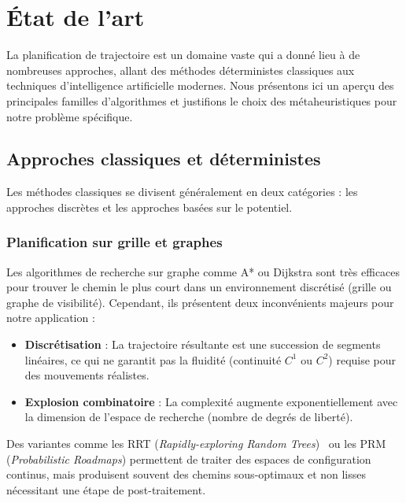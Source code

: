 \section{État de l'art}
\label{sec:etat_art}

La planification de trajectoire est un domaine vaste qui a donné lieu à de nombreuses approches, allant des méthodes déterministes classiques aux techniques d'intelligence artificielle modernes. Nous présentons ici un aperçu des principales familles d'algorithmes et justifions le choix des métaheuristiques pour notre problème spécifique.

\subsection{Approches classiques et déterministes}

Les méthodes classiques se divisent généralement en deux catégories : les approches discrètes et les approches basées sur le potentiel.

\subsubsection{Planification sur grille et graphes}
Les algorithmes de recherche sur graphe comme A* \cite{hart1968} ou Dijkstra sont très efficaces pour trouver le chemin le plus court dans un environnement discrétisé (grille ou graphe de visibilité). Cependant, ils présentent deux inconvénients majeurs pour notre application :
\begin{itemize}
    \item \textbf{Discrétisation} : La trajectoire résultante est une succession de segments linéaires, ce qui ne garantit pas la fluidité (continuité $C^1$ ou $C^2$) requise pour des mouvements réalistes.
    \item \textbf{Explosion combinatoire} : La complexité augmente exponentiellement avec la dimension de l'espace de recherche (nombre de degrés de liberté).
\end{itemize}
Des variantes comme les RRT (\textit{Rapidly-exploring Random
Trees})~\cite{lavalle1998} ou les PRM (\textit{Probabilistic Roadmaps})
permettent de traiter des espaces de configuration continus, mais produisent
souvent des chemins sous-optimaux et non lisses nécessitant une étape de
post-traitement.

